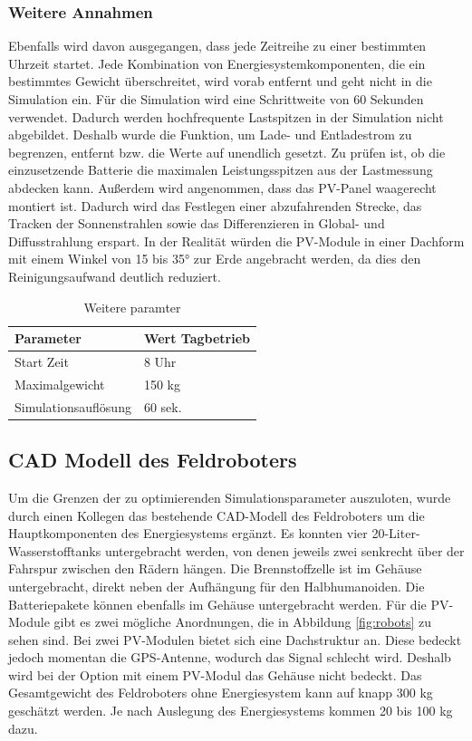 \subsubsection{Weitere Annahmen}
Ebenfalls wird davon ausgegangen, dass jede Zeitreihe zu einer bestimmten Uhrzeit startet. Jede Kombination von Energiesystemkomponenten, die ein bestimmtes Gewicht überschreitet, wird vorab entfernt und geht nicht in die Simulation ein. Für die Simulation wird eine Schrittweite von 60 Sekunden verwendet. Dadurch werden hochfrequente Lastspitzen in der Simulation nicht abgebildet. Deshalb wurde die Funktion, um Lade- und Entladestrom zu begrenzen, entfernt bzw. die Werte auf unendlich gesetzt. Zu prüfen ist, ob die einzusetzende Batterie die maximalen Leistungsspitzen aus der Lastmessung abdecken kann. Außerdem wird angenommen, dass das PV-Panel waagerecht montiert ist. Dadurch wird das Festlegen einer abzufahrenden Strecke, das Tracken der Sonnenstrahlen sowie das Differenzieren in Global- und Diffusstrahlung erspart. In der Realität würden die PV-Module in einer Dachform mit einem Winkel von 15 bis 35° zur Erde angebracht werden, da dies den Reinigungsaufwand deutlich reduziert.

\begin{table}[h]
\centering
\begin{tabular}{|l|l|}
\hline
\textbf{Parameter} & \textbf{Wert Tagbetrieb} \\ \hline
Start Zeit & 8 Uhr \\ \hline
Maximalgewicht & 150 kg \\ \hline
Simulationsauflösung & 60 sek. \\ \hline
\end{tabular}
\caption{Weitere paramter}
\end{table}


\subsection{CAD Modell des Feldroboters} 

Um die Grenzen der zu optimierenden Simulationsparameter auszuloten, wurde durch einen Kollegen das bestehende CAD-Modell des Feldroboters um die Hauptkomponenten des Energiesystems ergänzt. Es konnten vier 20-Liter-Wasserstofftanks untergebracht werden, von denen jeweils zwei senkrecht über der Fahrspur zwischen den Rädern hängen. Die Brennstoffzelle ist im Gehäuse untergebracht, direkt neben der Aufhängung für den Halbhumanoiden. Die Batteriepakete können ebenfalls im Gehäuse untergebracht werden. Für die PV-Module gibt es zwei mögliche Anordnungen, die in Abbildung \ref{fig:robots} zu sehen sind. Bei zwei PV-Modulen bietet sich eine Dachstruktur an. Diese bedeckt jedoch momentan die GPS-Antenne, wodurch das Signal schlecht wird. Deshalb wird bei der Option mit einem PV-Modul das Gehäuse nicht bedeckt. Das Gesamtgewicht des Feldroboters ohne Energiesystem kann auf knapp 300 kg geschätzt werden. Je nach Auslegung des Energiesystems kommen 20 bis 100 kg dazu.

